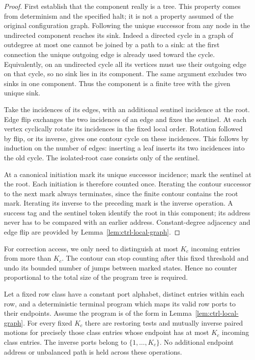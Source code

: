 \begin{proof}
First establish that the component really is a tree. This property comes from determinism and the specified halt; it is not a property assumed of the original configuration graph. Following the unique successor from any node in the undirected
component reaches its sink.  Indeed a directed cycle in a graph of
outdegree at most one cannot be joined by a path to a sink: at the
first connection the unique outgoing edge is already used toward the
cycle.  Equivalently, on an undirected cycle all its vertices must use
their outgoing edge on that cycle, so no sink lies in its component.
The same argument excludes two sinks in one component.  Thus the
component is a finite tree with the given unique sink.

Take the incidences of its edges, with an additional sentinel incidence
at the root.  Edge flip exchanges the two incidences of an edge and
fixes the sentinel.  At each vertex cyclically rotate its incidences in
the fixed local order.  Rotation followed by flip, or its inverse,
gives one contour cycle on these incidences.  This follows by induction
on the number of edges: inserting a leaf inserts its two incidences
into the old cycle.  The isolated-root case consists only of the
sentinel.

At a canonical initiation mark its unique successor incidence; mark
the sentinel at the root.  Each initiation is therefore counted once.
Iterating the contour successor to the next mark always terminates,
since the finite contour contains the root mark.  Iterating its inverse
to the preceding mark is the inverse operation.  A success tag and the
sentinel token identify the root in this component; its address never
has to be compared with an earlier address.  Constant-degree adjacency
and edge flip are provided by Lemma~\ref{lem:ctrl-local-graph}.
\end{proof}

For correction access, we only need to distinguish at most $K_c$ incoming entries from more than $K_c$. The contour can stop counting after this fixed threshold and undo its bounded number of jumps between marked states. Hence no counter proportional to the total size of the program tree is required.

\begin{lemma}\label{lem:ctrl-cap}
Let a fixed row class have a constant port alphabet, distinct entries
within each row, and a deterministic terminal program which maps its
valid row ports to their endpoints.  Assume the program is of the form
in Lemma~\ref{lem:ctrl-local-graph}.  For every fixed $K_c$ there are
restoring tests and mutually inverse paired motions for precisely those
class entries whose endpoint has at most $K_c$ incoming class entries.
The inverse ports belong to $\{1,\ldots,K_c\}$.  No additional endpoint
address or unbalanced path is held across these operations.
\end{lemma}


